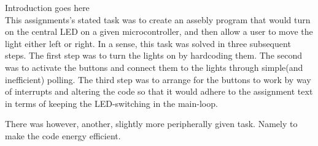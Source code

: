 Introduction goes here\\
This assignments's stated task was to create an assebly program that would turn on the central LED on a given microcontroller, and then allow a user to move the light either left or right.
In a sense, this task was solved in three subsequent steps. The first step was to turn the lights on by hardcoding them. The second was to activate the buttons and connect them to the lights through simple(and inefficient) polling. The third step was to arrange for the buttons to work by way of interrupts and altering the code so that it would adhere to the assignment text in terms of keeping the LED-switching in the main-loop.

There was however, another, slightly more peripherally given task. Namely to make the code energy efficient. 
